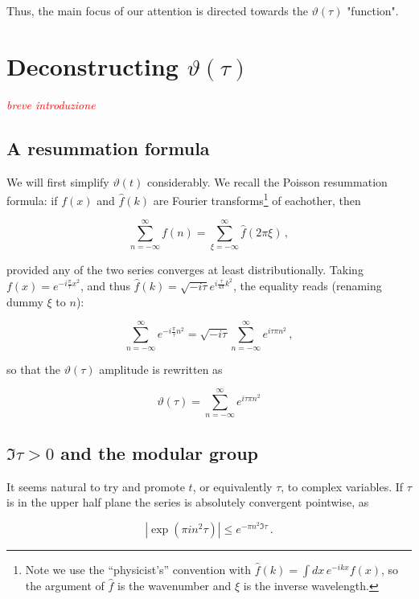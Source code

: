 \documentclass{article}
\newcommand{\T}{\ensuremath{\vartheta}}
\newcommand{\cmnt}[1]{\textcolor{red}{\emph{#1}}}
\newcommand{\sumZ}{\sum_{n=-\infty}^{\infty}}
\begin{document}
Thus, the main focus of our attention is directed towards the $\T(\tau)$ "function".


\section{Deconstructing $\T(\tau)$}

\cmnt{breve introduzione}

\subsection{A resummation formula}\label{resummation}

We will first simplify $\T(t)$ considerably. We recall the Poisson resummation formula\cite{bellman}: if $f(x)$ and $\hat f(k)$ are Fourier transforms\footnote{Note we use the ``physicist's'' convention with $\hat f(k) = \int dx\, e^{-ikx} f(x)$, so the argument of $\hat f$ is the wavenumber and $\xi$ is the inverse wavelength.} of eachother, then

\begin{equation}
    \sumZ f(n) = \sum_{\xi=-\infty}^{\infty} \hat f(2\pi\xi)\,,
\end{equation}

provided any of the two series converges at least distributionally. Taking $f(x) = e^{-i\frac{\pi}{\tau} x^2 }$, and thus $\hat f(k) = \sqrt{-i\tau} e^{i \frac{\tau}{4\pi} k^2}$, the equality reads (renaming dummy $\xi$ to $n$):

\begin{equation}
    \sumZ e^{-i\frac{\pi}{\tau} n^2 } = \sqrt{-i\tau} \sumZ e^{i\tau\pi n^2} \,,
\end{equation}

so that the $\T(\tau)$ amplitude is rewritten as

\begin{equation}
    \T(\tau) = \sumZ e^{i\tau\pi n^2}
\end{equation}

\subsection{$\Im{\tau}>0$ and the modular group} \label{sec:modular}

It seems natural to try and promote $t$, or equivalently $\tau$, to complex variables. If $\tau$ is in the upper half plane the series is absolutely convergent pointwise, as

\begin{equation}
    | \exp(\pi i n^2 \tau) | \leq e^{-\pi n^2 \Im\tau}\,.
\end{equation}
\end{document}
